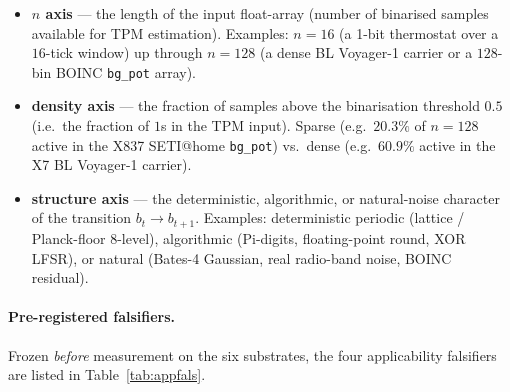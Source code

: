 \documentclass[11pt,a4paper]{article}
\begin{document}
\begin{itemize}
  \item \textbf{$n$ axis} --- the length of the input float-array (number
    of binarised samples available for TPM estimation). Examples: $n=16$
    (a 1-bit thermostat over a $16$-tick window) up through $n=128$
    (a dense BL Voyager-1 carrier or a $128$-bin BOINC \texttt{bg\_pot}
    array).
  \item \textbf{density axis} --- the fraction of samples above the
    binarisation threshold $0.5$ (i.e.\ the fraction of $1$s in the TPM
    input). Sparse (e.g.\ $20.3\%$ of $n=128$ active in the X837 SETI@home
    \texttt{bg\_pot}) vs.\ dense (e.g.\ $60.9\%$ active in the X7 BL
    Voyager-1 carrier).
  \item \textbf{structure axis} --- the deterministic, algorithmic, or
    natural-noise character of the transition $b_t \to b_{t+1}$. Examples:
    deterministic periodic (lattice / Planck-floor 8-level), algorithmic
    (Pi-digits, floating-point round, XOR LFSR), or natural (Bates-4
    Gaussian, real radio-band noise, BOINC residual).
\end{itemize}

\paragraph{Pre-registered falsifiers.} Frozen \emph{before} measurement on
the six substrates, the four applicability falsifiers are listed in
Table~\ref{tab:appfals}.
\end{document}

